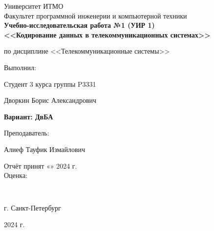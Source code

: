 \begin{center}
	\vspace{1cm}
	\large{Университет ИТМО}\\
	\large{Факультет программной инженерии и компьютерной техники}\\
	\vspace{4cm}
	\Large{\textbf{Учебно-исследовательская работа №1 (УИР 1)\\}}
	\vspace{0.3cm}
	\large{\textbf{<<Кодирование данных в телекоммуникационных системах>>\\}}
	\vspace{-0.3cm}
	\begin{center}
		\large{по дисциплине <<Телекоммуникационные системы>>}
	\end{center}
	\vspace{3cm}
\end{center}
\normalsize{
	\begin{flushright}
		Выполнил:
		\par
		Студент 3 курса группы P3331
		\par
		Дворкин Борис Александрович
		\par
		\textbf{Вариант: ДвБА}
		\par
		\vspace{1cm}
		Преподаватель:
		\par
		Алиеф Тауфик Измайлович
		\par
		\noindent Отчёт принят «\underline{\hspace{0.7cm}}» \underline{\hspace{1.3cm}} 2024 г.\\
		Оценка: \underline{\hspace{2cm}}
	\end{flushright}
}\\
\vspace{6cm}
\begin{center} г. Санкт-Петербург
	\par
	2024 г.
\end{center}
\thispagestyle{empty}
\thispagestyle{empty}
